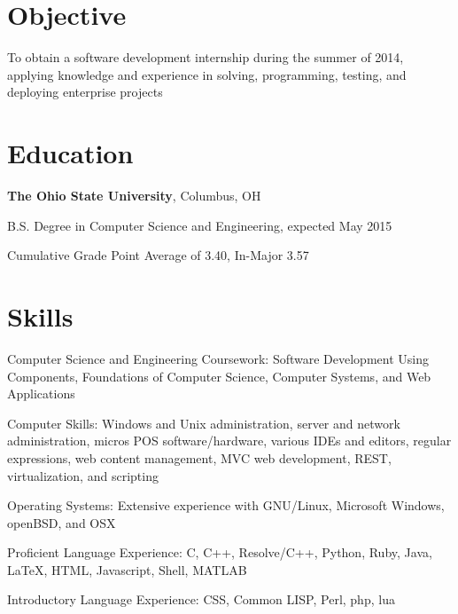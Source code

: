 \documentclass[letterpaper]{resume}
\begin{document}
\author{Christopher John Wallace}
\maketitle

\section{Objective}
\begin{compactitem}
\item
	To obtain a software development internship during the summer of 2014, applying
	knowledge and experience in solving, programming, testing, and
	deploying enterprise projects
\end{compactitem}

\section{Education}
\textbf{The Ohio State University}, Columbus, OH

\begin{compactitem}
\item B.S. Degree in Computer Science and Engineering, expected May 2015
\item Cumulative Grade Point Average of 3.40, In-Major 3.57
\end{compactitem}

\section{Skills}

\begin{compactitem}
\item
	Computer Science and Engineering Coursework:
	Software Development Using Components, Foundations of Computer Science,
	Computer Systems, and Web Applications

\item
	Computer Skills: Windows and Unix administration, server and network
	administration, micros POS software/hardware, various IDEs and editors,
	regular expressions, web content management, MVC web development,
	REST, virtualization, and scripting

\item
	Operating Systems: Extensive experience with GNU/Linux,
	Microsoft Windows, openBSD, and OSX

\item
	Proficient Language Experience: C, C++, Resolve/C++, Python, Ruby, Java,
	\LaTeX, HTML, Javascript, Shell, MATLAB
\item
	Introductory Language Experience: CSS, Common LISP, Perl, php, lua

\end{compactitem}
\end{document}
